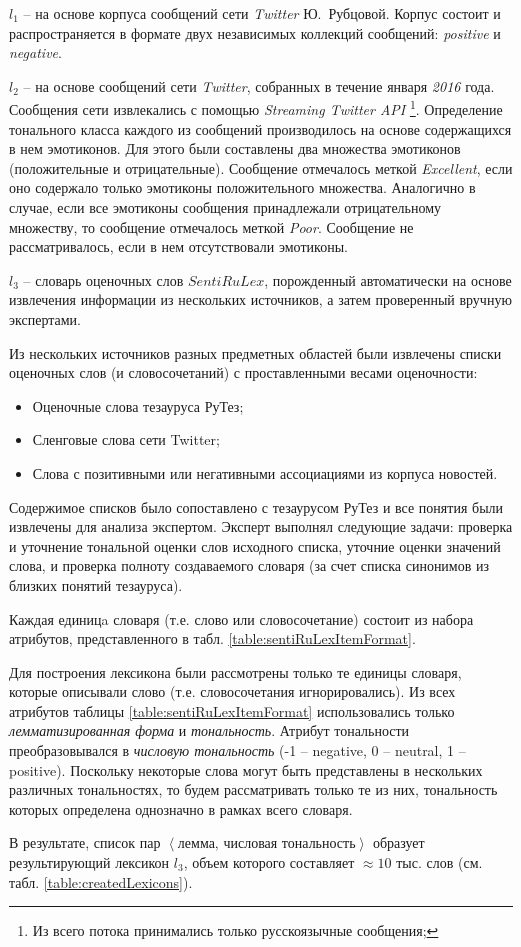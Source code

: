 $l_1$ -- на основе корпуса сообщений сети {\it Twitter} Ю.~Рубцовой.
Корпус состоит и распространяется в формате двух независимых коллекций
сообщений: {\it positive} и {\it negative}.

$l_2$ -- на основе сообщений сети {\it Twitter}, собранных в течение января {\it 2016} года.
Сообщения сети извлекались с помощью {\it Streaming Twitter API} \footnote{
    Из всего потока принимались только русскоязычные сообщения;
}.
Определение тонального класса каждого из сообщений производилось на
основе содержащихся в нем эмотиконов.
Для этого были составлены два множества эмотиконов (положительные и отрицательные).
Сообщение отмечалось меткой {\it Excellent}, если оно содержало
только эмотиконы положительного множества.
Аналогично в случае, если все эмотиконы сообщения принадлежали
отрицательному множеству, то сообщение отмечалось меткой {\it Poor}.
Сообщение не рассматривалось, если в нем отсутствовали эмотиконы.

$l_3$ -- словарь оценочных слов $SentiRuLex$, порожденный
автоматически на основе извлечения информации из нескольких источников,
а затем проверенный вручную экспертами.

Из нескольких источников разных предметных областей были
извлечены списки оценочных слов (и словосочетаний) с проставленными
весами оценочности:
\begin{itemize}
    \item Оценочные слова тезауруса РуТез;
    \item Сленговые слова сети Twitter;
    \item Слова с позитивными или негативными ассоциациями из корпуса новостей.
\end{itemize}
Содержимое списков было сопоставлено с тезаурусом РуТез и все понятия
были извлечены для анализа экспертом.
Эксперт выполнял следующие задачи:
проверка и уточнение тональной оценки слов исходного списка,
уточние оценки значений слова,
и проверка полноту создаваемого словаря (за счет списка синонимов из
близких понятий тезауруса).

Каждая единицa словаря (т.е. слово или словосочетание) состоит из набора
атрибутов, представленного в табл. \ref{table:sentiRuLexItemFormat}.



Для построения лексикона были рассмотрены только те единицы словаря,
которые описывали слово (т.е. словосочетания игнорировались).
Из всех атрибутов таблицы \ref{table:sentiRuLexItemFormat} использовались
только {\it лемматизированная форма} и {\it тональность}.
Атрибут тональности преобразовывался в {\it числовую тональность}
(-1 -- negative,
0 -- neutral,
1 -- positive).
Поскольку некоторые слова могут быть представлены
в нескольких различных тональностях, то будем рассматривать только те из них,
тональность которых определена однозначно в рамках всего словаря.

В результате, список пар $\left< \text{лемма, числовая тональность} \right>$
образует результирующий лексикон $l_3$, объем которого составляет $\approx10$ тыс. слов
(см. табл. \ref{table:createdLexicons}).

